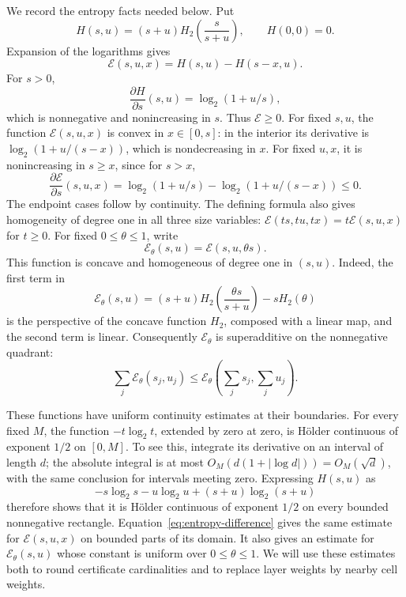 We record the entropy facts needed below. Put
\[
 H(s,u)=(s+u)H_2\!\left(\frac{s}{s+u}\right),\qquad H(0,0)=0.
\]
Expansion of the logarithms gives
\begin{equation}\label{eq:entropy-difference}
 \mathcal E(s,u,x)=H(s,u)-H(s-x,u).
\end{equation}
For \(s>0\),
\[
 \frac{\partial H}{\partial s}(s,u)=\log_2(1+u/s),
\]
which is nonnegative and nonincreasing in \(s\). Thus \(\mathcal E\ge0\).
For fixed \(s,u\), the function \(\mathcal E(s,u,x)\) is convex in
\(x\in[0,s]\): in the interior its derivative is
\(\log_2(1+u/(s-x))\), which is nondecreasing in \(x\). For fixed
\(u,x\), it is nonincreasing in \(s\ge x\), since for \(s>x\),
\[
 \frac{\partial\mathcal E}{\partial s}(s,u,x)
 =\log_2(1+u/s)-\log_2(1+u/(s-x))\le0.
\]
The endpoint cases follow by continuity. The defining formula also gives
homogeneity of degree one in all three size variables:
\(\mathcal E(ts,tu,tx)=t\mathcal E(s,u,x)\) for \(t\ge0\).
For fixed \(0\le\theta\le1\), write
\[
 \mathcal E_\theta(s,u)=\mathcal E(s,u,\theta s).
\]
This function is concave and homogeneous of degree one in \((s,u)\).
Indeed, the first term in
\[
 \mathcal E_\theta(s,u)
 =(s+u)H_2\!\left(\frac{\theta s}{s+u}\right)-sH_2(\theta)
\]
is the perspective of the concave function \(H_2\), composed with a
linear map, and the second term is linear. Consequently
\(\mathcal E_\theta\) is superadditive on the nonnegative quadrant:
\begin{equation}\label{eq:entropy-superadditive}
 \sum_j\mathcal E_\theta(s_j,u_j)
 \le \mathcal E_\theta\!\left(\sum_j s_j,\sum_j u_j\right).
\end{equation}

These functions have uniform continuity estimates at their boundaries.
For every fixed \(M\), the function \(-t\log_2t\), extended by zero at
zero, is H\"older continuous of exponent \(1/2\) on \([0,M]\). To see
this, integrate its derivative on an interval of length \(d\); the
absolute integral is at most
\(O_M(d(1+|\log d|))=O_M(\sqrt d)\), with the same conclusion for
intervals meeting zero. Expressing \(H(s,u)\) as
\[
 -s\log_2s-u\log_2u+(s+u)\log_2(s+u)
\]
therefore shows that it is H\"older continuous of exponent \(1/2\) on
every bounded nonnegative rectangle. Equation~\eqref{eq:entropy-difference}
gives the same estimate for \(\mathcal E(s,u,x)\) on bounded parts of
its domain. It also gives an estimate for \(\mathcal E_\theta(s,u)\)
whose constant is uniform over \(0\le\theta\le1\). We will use these
estimates both to round certificate cardinalities and to replace layer
weights by nearby cell weights.

